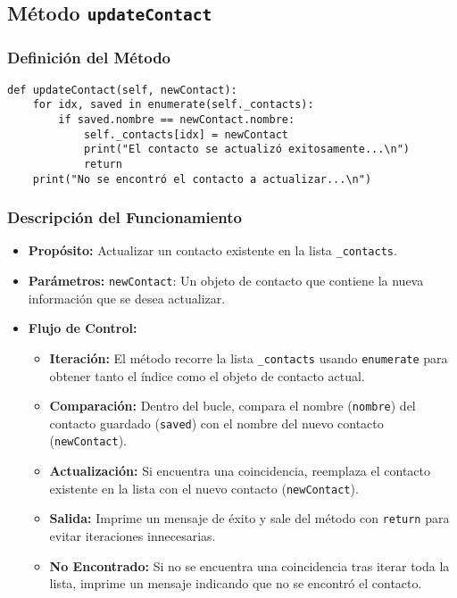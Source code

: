 \subsection{Método \texttt{updateContact}}
\subsubsection{Definición del Método}

\begin{verbatim}
def updateContact(self, newContact):
    for idx, saved in enumerate(self._contacts):
        if saved.nombre == newContact.nombre:
            self._contacts[idx] = newContact
            print("El contacto se actualizó exitosamente...\n")
            return
    print("No se encontró el contacto a actualizar...\n")
\end{verbatim}

\subsubsection{Descripción del Funcionamiento}
\begin{itemize}
    \item \textbf{Propósito:}
    Actualizar un contacto existente en la lista \texttt{\_contacts}.
    \item \textbf{Parámetros:}
    \texttt{newContact}: Un objeto de contacto que contiene la nueva información que se desea actualizar.
    \item \textbf{Flujo de Control:}
    \begin{itemize}
        \item \textbf{Iteración:} El método recorre la lista \texttt{\_contacts} usando \texttt{enumerate} para obtener tanto el índice como el objeto de contacto actual.
        \item \textbf{Comparación:} Dentro del bucle, compara el nombre (\texttt{nombre}) del contacto guardado (\texttt{saved}) con el nombre del nuevo contacto (\texttt{newContact}).
        \item \textbf{Actualización:} Si encuentra una coincidencia, reemplaza el contacto existente en la lista con el nuevo contacto (\texttt{newContact}).
        \item \textbf{Salida:} Imprime un mensaje de éxito y sale del método con \texttt{return} para evitar iteraciones innecesarias.
        \item \textbf{No Encontrado:} Si no se encuentra una coincidencia tras iterar toda la lista, imprime un mensaje indicando que no se encontró el contacto.
    \end{itemize}
\end{itemize}


